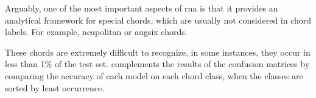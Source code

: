 
Arguably, one of the most important aspects of \gls{rna} is
that it provides an analytical framework for special chords,
which are usually not considered in chord labels. For
example, \gls{neapolitan} or \gls{augsix} chords.

These chords are extremely difficult to recognize, in some
instances, they occur in less than 1\% of the test set.
 complements the results of the
confusion matrices by comparing the accuracy of each model
on each chord class, when the classes are sorted by least
occurrence.

